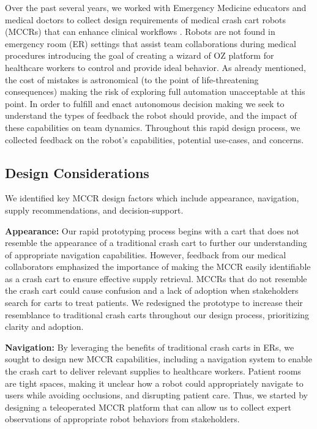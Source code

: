 Over the past several years, we worked with Emergency Medicine educators and medical doctors to collect design requirements of medical crash cart robots  (MCCRs) that can enhance clinical workflows \cite{taylor2019coordinating_blind,taylor2024towards_blind}. 
Robots are not found in emergency room (ER) settings that assist team collaborations during medical procedures introducing the goal of creating a wizard of OZ platform for healthcare workers to control and provide ideal behavior. 
As already mentioned, the cost of mistakes is astronomical (to the point of life-threatening consequences) making the risk of exploring full automation unacceptable at this point. 
In order to fulfill and enact autonomous decision making we seek to understand the types of feedback the robot should provide, and the impact of these capabilities on team dynamics.
Throughout this rapid design process, we collected feedback on the robot's capabilities, potential use-cases, and concerns. 

 

\subsection{Design Considerations}

We identified key MCCR design factors which include appearance, navigation, supply recommendations, and decision-support.

\textbf{Appearance:} Our rapid prototyping process begins with a cart that does not resemble the appearance of a traditional crash cart to further our understanding of appropriate navigation capabilities. 
However, feedback from our medical collaborators emphasized the importance of making the MCCR easily identifiable as a crash cart to ensure effective supply retrieval. 
MCCRs that do not resemble the crash cart could cause confusion and a lack of adoption when stakeholders search for carts to treat patients. 
We redesigned the prototype to increase their resemblance to traditional crash carts throughout our design process, prioritizing clarity and adoption.

\textbf{Navigation:} By leveraging the benefits of traditional crash carts in ERs, we sought to design new MCCR capabilities, including a navigation system to enable the crash cart to deliver relevant supplies to healthcare workers.
Patient rooms are tight spaces, making it unclear how a robot could appropriately navigate to users while avoiding occlusions, and disrupting patient care.
Thus, we started by designing a teleoperated MCCR platform that can allow us to collect expert observations of appropriate robot behaviors from stakeholders. 

